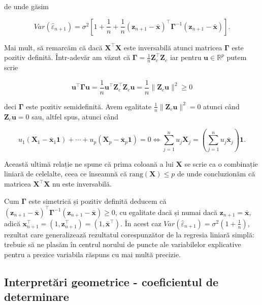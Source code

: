 \documentclass[]{article}
\begin{document}
de unde găsim

\[
  Var(\hat{\varepsilon}_{n+1}) = \sigma^2\left[1 + \frac{1}{n} + \frac{1}{n}(\boldsymbol z_{n+1} - \bar{\boldsymbol x})^\intercal \boldsymbol \Gamma^{-1}(\boldsymbol z_{n+1} - \bar{\boldsymbol x})\right].
\]

Mai mult, să remarcăm că dacă \(\boldsymbol X^\intercal \boldsymbol X\)
este inversabilă atunci matricea \(\boldsymbol \Gamma\) este pozitiv
definită. Într-adevăr am văzut că
\(\boldsymbol \Gamma = \frac{1}{n}\boldsymbol Z_c^\intercal\boldsymbol Z_c\)
iar pentru \(\boldsymbol u \in\mathbb{R}^p\) putem scrie

\[
  \boldsymbol u^\intercal \boldsymbol \Gamma\boldsymbol u = \frac{1}{n}\boldsymbol u^\intercal \boldsymbol Z_c^\intercal\boldsymbol Z_c \boldsymbol u = \frac{1}{n}\lVert\boldsymbol Z_c \boldsymbol u\rVert^2 \geq 0
\]

deci \(\boldsymbol \Gamma\) este pozitiv semidefinită. Avem egalitate
\(\frac{1}{n}\lVert\boldsymbol Z_c \boldsymbol u\rVert^2 = 0\) atunci
când \(\boldsymbol Z_c \boldsymbol u = 0\) sau, altfel spus, atunci când

\[
  u_1(\boldsymbol X_1 - \bar{\boldsymbol x}_1\mathbf{1}) + \cdots + u_p(\boldsymbol X_p - \bar{\boldsymbol x}_p\mathbf{1}) = 0 \iff \sum_{j=1}^{n}u_j\boldsymbol X_j = \left(\sum_{j=1}^{n}u_j\bar{\boldsymbol x}_j\right)\mathbf{1}.
\]

Această ultimă relație ne spune că prima coloană a lui \(\boldsymbol X\)
se scrie ca o combinație liniară de celelalte, ceea ce înseamnă că
\(\mathrm{rang}(\boldsymbol X)\leq p\) de unde concluzionăm că matricea
\(\boldsymbol X^\intercal \boldsymbol X\) nu este inversabilă.

Cum \(\boldsymbol \Gamma\) este simetrică și pozitiv definită deducem că
\((\boldsymbol z_{n+1} - \bar{\boldsymbol x})^\intercal \boldsymbol \Gamma^{-1}(\boldsymbol z_{n+1} - \bar{\boldsymbol x})\geq 0\),
cu egalitate dacă și numai dacă
\(\boldsymbol z_{n+1} = \bar{\boldsymbol x}\), adică
\(\boldsymbol x_{n+1}^\intercal = (1, \boldsymbol z_{n+1}^\intercal) = (1, \bar{\boldsymbol x}^\intercal)\).
În acest caz
\(Var(\hat{\varepsilon}_{n+1}) = \sigma^2\left(1+\frac{1}{n}\right)\),
rezultat care generalizează rezultatul corespunzător de la regresia
liniară simplă: trebuie să ne plasăm în centrul norului de puncte ale
variabilelor explicative pentru a prezice variabila răspuns cu mai multă
precizie.

\subsection{Interpretări geometrice - coeficientul de
determinare}\label{interpretari-geometrice---coeficientul-de-determinare}
\end{document}
